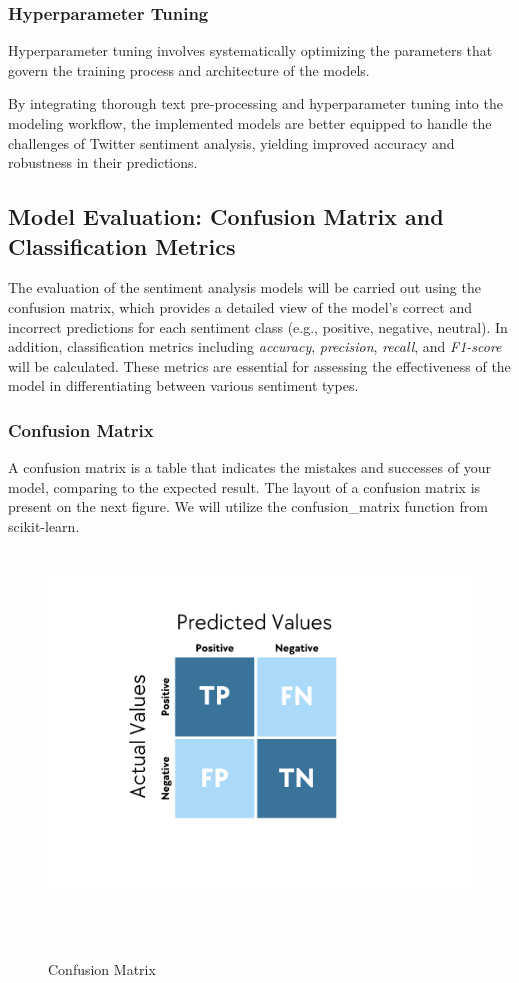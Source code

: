 \subsubsection{Hyperparameter Tuning}
Hyperparameter tuning involves systematically optimizing the parameters that govern the training process and architecture of the models. 

By integrating thorough text pre-processing and hyperparameter tuning into the modeling workflow, the implemented models are better equipped to handle the challenges of Twitter sentiment analysis, yielding improved accuracy and robustness in their predictions.

\subsection{Model Evaluation: Confusion Matrix and Classification Metrics}

The evaluation of the sentiment analysis models will be carried out using the confusion matrix, which provides a detailed view of the model’s correct and incorrect predictions for each sentiment class (e.g., positive, negative, neutral). In addition, classification metrics including \textit{accuracy}, \textit{precision}, \textit{recall}, and \textit{F1-score} will be calculated. These metrics are essential for assessing the effectiveness of the model in differentiating between various sentiment types.

\subsubsection{Confusion Matrix}

A confusion matrix is a table that indicates the mistakes and successes of your model, comparing to the expected result. The layout of a confusion matrix is present on the next figure. We will utilize the confusion\_matrix function from scikit-learn.

\begin{figure}[h!]
    \centering
    \includegraphics[width=1\linewidth]{images/confusion-matrix.png}
    \caption{Confusion Matrix}
    \label{fig:confusion_matrix}
\end{figure}

